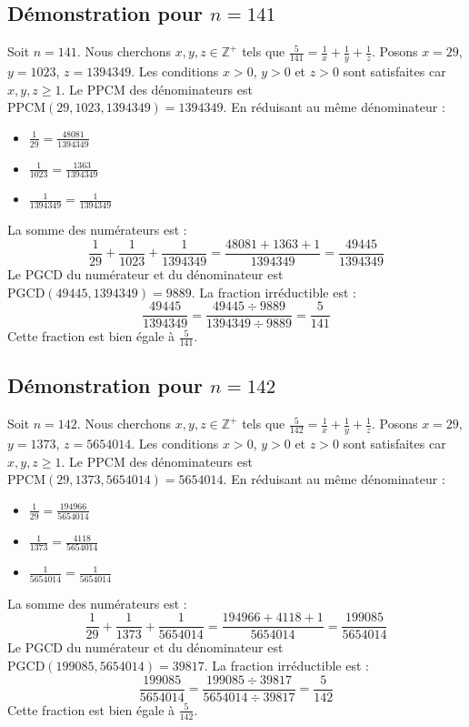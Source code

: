 \documentclass[11pt,a4paper]{article}
\begin{document}
\subsection{Démonstration pour $n = 141$}
Soit $n = 141$. Nous cherchons $x, y, z \in \mathbb{Z}^{+}$ tels que $\frac{5}{141} = \frac{1}{x} + \frac{1}{y} + \frac{1}{z}$.
Posons $x = 29$, $y = 1023$, $z = 1394349$.
Les conditions $x > 0$, $y > 0$ et $z > 0$ sont satisfaites car $x, y, z \geq 1$.
Le PPCM des dénominateurs est $\text{PPCM}(29, 1023, 1394349) = 1394349$.
En réduisant au même dénominateur :
\begin{itemize}
    \item $\frac{1}{29} = \frac{48081}{1394349}$
    \item $\frac{1}{1023} = \frac{1363}{1394349}$
    \item $\frac{1}{1394349} = \frac{1}{1394349}$
\end{itemize}
La somme des numérateurs est :
$$ \frac{1}{29} + \frac{1}{1023} + \frac{1}{1394349} = \frac{48081 + 1363 + 1}{1394349} = \frac{49445}{1394349} $$
Le PGCD du numérateur et du dénominateur est $\text{PGCD}(49445, 1394349) = 9889$.
La fraction irréductible est :
$$ \frac{49445}{1394349} = \frac{49445 \div 9889}{1394349 \div 9889} = \frac{5}{141} $$
Cette fraction est bien égale à $\frac{5}{141}$.

\subsection{Démonstration pour $n = 142$}
Soit $n = 142$. Nous cherchons $x, y, z \in \mathbb{Z}^{+}$ tels que $\frac{5}{142} = \frac{1}{x} + \frac{1}{y} + \frac{1}{z}$.
Posons $x = 29$, $y = 1373$, $z = 5654014$.
Les conditions $x > 0$, $y > 0$ et $z > 0$ sont satisfaites car $x, y, z \geq 1$.
Le PPCM des dénominateurs est $\text{PPCM}(29, 1373, 5654014) = 5654014$.
En réduisant au même dénominateur :
\begin{itemize}
    \item $\frac{1}{29} = \frac{194966}{5654014}$
    \item $\frac{1}{1373} = \frac{4118}{5654014}$
    \item $\frac{1}{5654014} = \frac{1}{5654014}$
\end{itemize}
La somme des numérateurs est :
$$ \frac{1}{29} + \frac{1}{1373} + \frac{1}{5654014} = \frac{194966 + 4118 + 1}{5654014} = \frac{199085}{5654014} $$
Le PGCD du numérateur et du dénominateur est $\text{PGCD}(199085, 5654014) = 39817$.
La fraction irréductible est :
$$ \frac{199085}{5654014} = \frac{199085 \div 39817}{5654014 \div 39817} = \frac{5}{142} $$
Cette fraction est bien égale à $\frac{5}{142}$.
\end{document}
